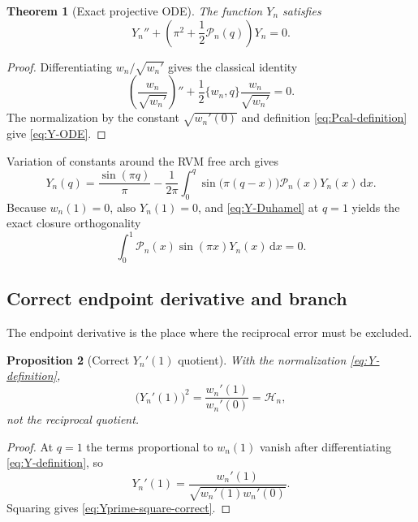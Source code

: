 \documentclass[11pt]{amsart}
\numberwithin{equation}{section}
\newtheorem{theorem}{Theorem}[section]
\newtheorem{proposition}[theorem]{Proposition}
\theoremstyle{definition}
\theoremstyle{remark}
\newcommand{\dd}{\,\mathrm d}
\newcommand{\Hcal}{\mathcal H}
\newcommand{\Pcal}{\mathcal P}
\begin{document}
\begin{theorem}[Exact projective ODE]
\label{thm:projective-ode}
The function $Y_n$ satisfies
\begin{equation}
Y_n''+\left(\pi^2+\frac12\Pcal_n(q)\right)Y_n=0.
\label{eq:Y-ODE}
\end{equation}
\end{theorem}

\begin{proof}
Differentiating $w_n/\sqrt{w_n'}$ gives the classical identity
\begin{equation}
\left(\frac{w_n}{\sqrt{w_n'}}\right)''
+\frac12\{w_n,q\}\frac{w_n}{\sqrt{w_n'}}=0.
\label{eq:Schwarzian-ODE-identity}
\end{equation}
The normalization by the constant $\sqrt{w_n'(0)}$ and definition \eqref{eq:Pcal-definition} give \eqref{eq:Y-ODE}.
\end{proof}

Variation of constants around the RVM free arch gives
\begin{equation}
Y_n(q)
=\frac{\sin(\pi q)}{\pi}
-\frac1{2\pi}\int_0^q\sin\bigl(\pi(q-x)\bigr)\Pcal_n(x)Y_n(x)\dd x.
\label{eq:Y-Duhamel}
\end{equation}
Because $w_n(1)=0$, also $Y_n(1)=0$, and \eqref{eq:Y-Duhamel} at $q=1$ yields the exact closure orthogonality
\begin{equation}
\int_0^1\Pcal_n(x)\sin(\pi x)Y_n(x)\dd x=0.
\label{eq:projective-orthogonality}
\end{equation}

\subsection{Correct endpoint derivative and branch}
\label{subsec:Y-endpoint}

The endpoint derivative is the place where the reciprocal error must be excluded.

\begin{proposition}[Correct $Y_n'(1)$ quotient]
\label{prop:Y-endpoint-correct}
With the normalization \eqref{eq:Y-definition},
\begin{equation}
\bigl(Y_n'(1)\bigr)^2
=\frac{w_n'(1)}{w_n'(0)}
=\Hcal_n,
\label{eq:Yprime-square-correct}
\end{equation}
not the reciprocal quotient.
\end{proposition}

\begin{proof}
At $q=1$ the terms proportional to $w_n(1)$ vanish after differentiating \eqref{eq:Y-definition}, so
\begin{equation}
Y_n'(1)=\frac{w_n'(1)}{\sqrt{w_n'(1)w_n'(0)}}.
\label{eq:Yprime1-direct}
\end{equation}
Squaring gives \eqref{eq:Yprime-square-correct}.
\end{proof}
\end{document}
